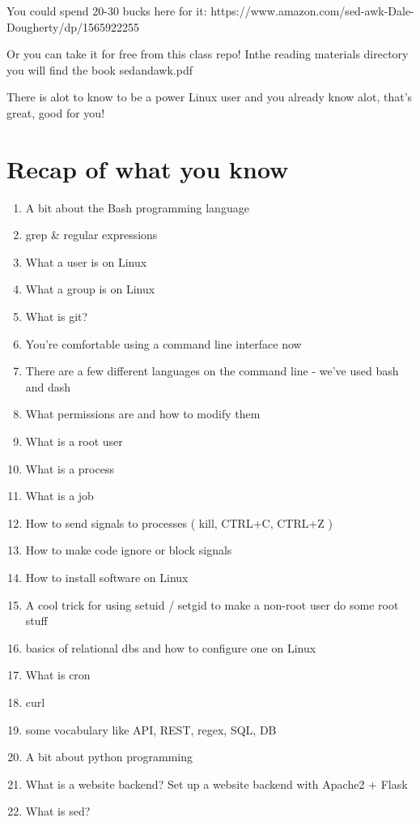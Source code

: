 \documentclass[10pt]{article}
\begin{document}
You could spend 20-30 bucks here for it:
https://www.amazon.com/sed-awk-Dale-Dougherty/dp/1565922255

Or you can take it for free from this class repo! Inthe reading materials directory you will find the book sedandawk.pdf

There is alot to know to be a power Linux user and you already know alot, that's great, good for you!

\section{Recap of what you know}
\begin{enumerate}
\item A bit about the Bash programming language
\item grep \& regular expressions
\item What a user is on Linux
\item What a group is on Linux
\item What is git?
\item You're comfortable using a command line interface now
\item There are a few different languages on the command line - we've used bash and dash
\item What permissions are and how to modify them
\item What is a root user
\item What is a process
\item What is a job
\item How to send signals to processes ( kill, CTRL+C, CTRL+Z )
\item How to make code ignore or block signals
\item How to install software on Linux
\item A cool trick for using setuid / setgid to make a non-root user do some root stuff
\item basics of relational dbs and how to configure one on Linux
\item What is cron
\item curl
\item some vocabulary like API, REST, regex, SQL, DB
\item A bit about python programming
\item What is a website backend? Set up a website backend with Apache2 + Flask
\item What is sed?
\end{enumerate}
\end{document}

